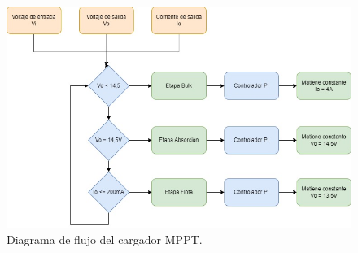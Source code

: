 \begin{figure}[H]
    \centering
    \includegraphics[width=1\linewidth]{analisis-tecnico/Diagrama de flujo MPPT.jpg}
    \caption{Diagrama de flujo del cargador MPPT.}
    \label{fig:diagrama bloque mppt}
\end{figure}